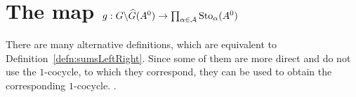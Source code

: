 \begin{comment}
  \begin{cor}
    \marginnote{\cite[Cor.III.2.7]{Loday1994}}
    Write the twisted cocycle $\dot\phi\in\exp_{A^1}(\hat F^k)$ in terms of
    sums of $\hat F^k$ over $\cU^{\leq k}$:
    \[
      \dot \phi_\alpha=S_\alpha^-(\hat F^k)^{-1}S_\alpha^+(\hat F^k)
      \text{, }
      \alpha\in\A^{\leq k} \,.
    \]
    Then, the factors $\dot g^k=(\dot g^k_\alpha)_{\alpha\in\A^{\leq k}}$ and
    $\dot f^k=(\dot f^k_\alpha)_{\alpha\in\A^{\leq k}}$ in the induced
    decompositions satisfy
    \begin{align*}
      \dot g_\alpha^k &=S_\alpha^+(\hat F^{<k})^{-1}
                        S_\alpha^-(\hat F^k)^{-1}
                        S_\alpha^+(\hat F^k)
                        S_\alpha^+(\hat F^{<k}) \,,
    \\\dot f_\alpha^k &=S_\alpha^-(\hat F^{<k})^{-1}
                        S_\alpha^-(\hat F^k)^{-1}
                        S_\alpha^+(\hat F^k)
                        S_\alpha^+(\hat F^{<k}) \,.
    \end{align*}
  \end{cor}
\end{comment}

\section{The map
  $g:G\backslash\widehat G(A^0)\to\prod_{\alpha\in\mathcal{A}}\operatorname{Sto}_\alpha(A^0)$}%
  \label{sect:multisummmap}
There are many alternative definitions, which are equivalent to
Definition~\ref{defn:sumsLeftRight}. Since some of them are more direct
and do not use the $1$-cocycle, to which they correspond, they can be used to
obtain the corresponding $1$-cocycle.  \cite{Loday2014}.

